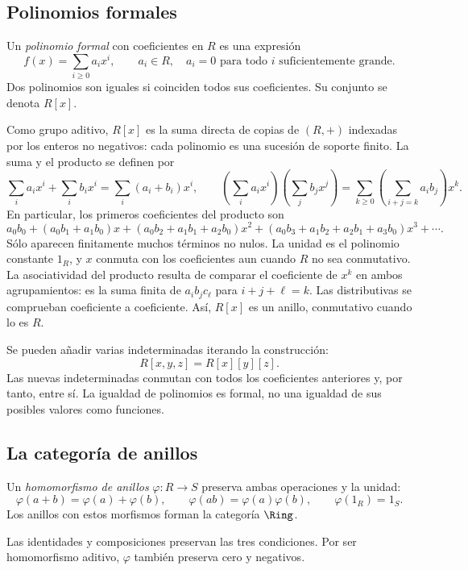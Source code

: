 \subsection{Polinomios formales}
\begin{defi}
Un \emph{polinomio formal} con coeficientes en $R$ es una expresión
\[
f(x)=\sum_{i\geq0}a_ix^i,
\qquad a_i\in R,\quad a_i=0\text{ para todo }i\text{ suficientemente grande}.
\]
Dos polinomios son iguales si coinciden todos sus coeficientes. Su conjunto se denota $R[x]$.
\end{defi}
Como grupo aditivo, $R[x]$ es la suma directa de copias de $(R,+)$ indexadas por los enteros no negativos: cada polinomio es una sucesión de soporte finito. La suma y el producto se definen por
\[
\sum_i a_ix^i+\sum_i b_ix^i=\sum_i(a_i+b_i)x^i,
\qquad
\left(\sum_i a_ix^i\right)\left(\sum_j b_jx^j\right)
=\sum_{k\geq0}\left(\sum_{i+j=k}a_ib_j\right)x^k.
\]
En particular, los primeros coeficientes del producto son
\[
a_0b_0+(a_0b_1+a_1b_0)x
 +(a_0b_2+a_1b_1+a_2b_0)x^2
 +(a_0b_3+a_1b_2+a_2b_1+a_3b_0)x^3+\cdots.
\]
Sólo aparecen finitamente muchos términos no nulos. La unidad es el polinomio constante $1_R$, y $x$ conmuta con los coeficientes aun cuando $R$ no sea conmutativo. La asociatividad del producto resulta de comparar el coeficiente de $x^k$ en ambos agrupamientos: es la suma finita de $a_ib_jc_\ell$ para $i+j+\ell=k$. Las distributivas se comprueban coeficiente a coeficiente. Así, $R[x]$ es un anillo, conmutativo cuando lo es $R$.

Se pueden añadir varias indeterminadas iterando la construcción:
\[
R[x,y,z]=R[x][y][z].
\]
Las nuevas indeterminadas conmutan con todos los coeficientes anteriores y, por tanto, entre sí. La igualdad de polinomios es formal, no una igualdad de sus posibles valores como funciones.

\subsection{La categoría de anillos}
\begin{defi}
Un \emph{homomorfismo de anillos} $\varphi:R\to S$ preserva ambas operaciones y la unidad:
\[
\varphi(a+b)=\varphi(a)+\varphi(b),\qquad
\varphi(ab)=\varphi(a)\varphi(b),\qquad
\varphi(1_R)=1_S.
\]
Los anillos con estos morfismos forman la categoría $\Ring$.
\end{defi}
Las identidades y composiciones preservan las tres condiciones. Por ser homomorfismo aditivo, $\varphi$ también preserva cero y negativos.

